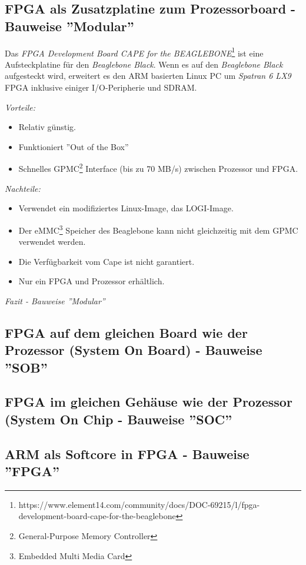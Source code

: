 \subsection{FPGA als Zusatzplatine zum Prozessorboard - Bauweise ''Modular''}
Das \textit{FPGA Development Board CAPE for the BEAGLEBONE}\footnote{https://www.element14.com/community/docs/DOC-69215/l/fpga-development-board-cape-for-the-beaglebone} ist eine Aufsteckplatine für den \textit{Beaglebone Black}.
Wenn es auf den \textit{Beaglebone Black} aufgesteckt wird, erweitert es den ARM basierten Linux PC um \textit{Spatran 6 LX9} FPGA inklusive einiger I/O-Peripherie und SDRAM.

\textit{Vorteile:}
\begin{itemize}
	\item Relativ günstig.
	\item Funktioniert ''Out of the Box''
	\item Schnelles GPMC\footnote{General-Purpose Memory Controller} Interface (bis zu 70 MB/s) zwischen Prozessor und FPGA.
\end{itemize}

\textit{Nachteile:}
\begin{itemize}
	\item Verwendet ein modifiziertes Linux-Image, das LOGI-Image.
	\item Der eMMC\footnote{Embedded Multi Media Card} Speicher des Beaglebone kann nicht gleichzeitig mit dem GPMC verwendet werden.
	\item Die Verfügbarkeit vom Cape ist nicht garantiert.
	\item Nur ein FPGA und Prozessor erhältlich.
\end{itemize}

\textit{Fazit - Bauweise ''Modular''}

\subsection{FPGA auf dem gleichen Board wie der Prozessor (System On Board) - Bauweise ''SOB''}
 
\subsection{FPGA im gleichen Gehäuse wie der Prozessor (System On Chip - Bauweise ''SOC''}

\subsection{ARM als Softcore in FPGA - Bauweise ''FPGA''}

